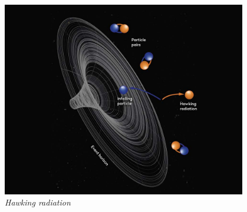 \newpage
\vspace{2em}
\begin{center}
    \includegraphics[width=0.8\textwidth]{47_ObserverDependentVacuum/Hawking-radiation-33a5ec1.jpg}\\
    {\small\textit{Hawking radiation}}
\end{center}